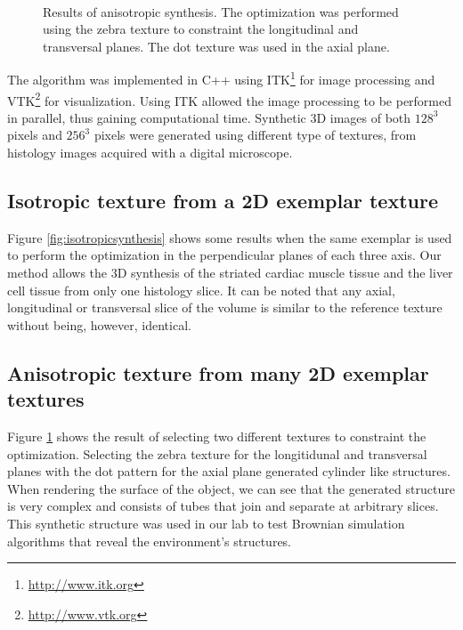 \begin{figure} 
 \centering 
 \\
 \caption{Results of anisotropic synthesis. The optimization was performed using the zebra texture to constraint the longitudinal and transversal planes. The dot texture was used in the axial plane.}
 \label{fig:3DAnisotropicTexture} 
\end{figure}

The algorithm was implemented in C++ using ITK\footnote{\url{http://www.itk.org}} for image processing and 
VTK\footnote{\url{http://www.vtk.org}} for visualization. 
Using ITK allowed the image processing to be performed in parallel, thus gaining computational time.
Synthetic 3D images of both $128^3$ pixels and $256^3$ pixels were generated using different type of textures, from histology images 
acquired with a digital microscope.%

\subsection{Isotropic texture from a 2D exemplar texture}

Figure \ref{fig:isotropicsynthesis} shows some results when the same exemplar is used
to perform the optimization in the perpendicular planes of each three axis. Our method allows the 3D synthesis of the striated 
cardiac muscle tissue and the liver cell tissue from only one histology slice. 
It can be noted that any axial, longitudinal or transversal slice of the volume is similar to the reference texture without being, however, identical.

\subsection{Anisotropic texture from many 2D exemplar textures}

Figure \ref{fig:3DAnisotropicTexture} shows the result of selecting two different textures 
to constraint the optimization.
Selecting the zebra texture for the longitidunal and transversal planes with the dot pattern for the axial plane generated cylinder like structures. 
When rendering the surface of the object, we can see that the generated structure 
is very complex and consists of tubes that join and separate at arbitrary slices.
This synthetic structure was used in our lab to test Brownian simulation algorithms 
that reveal the environment's structures.


